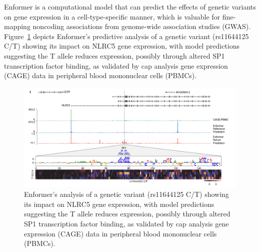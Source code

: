 \documentclass{article}
\begin{document}
Enformer is a computational model that can predict the effects of genetic variants on gene expression in a cell-type-specific manner, which is valuable for fine-mapping noncoding associations from genome-wide association studies (GWAS). Figure~\ref{fig:variant} depicts Enformer's predictive analysis of a genetic variant (rs11644125 C/T) showing its impact on NLRC5 gene expression, with model predictions suggesting the T allele reduces expression, possibly through altered SP1 transcription factor binding, as validated by cap analysis gene expression (CAGE) data in peripheral blood mononuclear cells (PBMCs).
\begin{figure}[ht]
\centering
\includegraphics[width=0.8\linewidth]{img/variant.png}
\caption{Enformer's analysis of a genetic variant (rs11644125 C/T) showing its impact on NLRC5 gene expression, with model predictions suggesting the T allele reduces expression, possibly through altered SP1 transcription factor binding, as validated by cap analysis gene expression (CAGE) data in peripheral blood mononuclear cells (PBMCs).}\label{fig:variant}
\end{figure}



\end{document}
